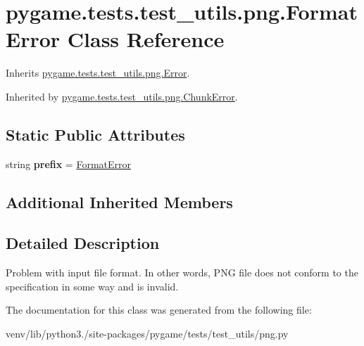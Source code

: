 \hypertarget{classpygame_1_1tests_1_1test__utils_1_1png_1_1_format_error}{}\section{pygame.\+tests.\+test\+\_\+utils.\+png.\+Format\+Error Class Reference}
\label{classpygame_1_1tests_1_1test__utils_1_1png_1_1_format_error}


Inherits \hyperlink{classpygame_1_1tests_1_1test__utils_1_1png_1_1_error}{pygame.\+tests.\+test\+\_\+utils.\+png.\+Error}.



Inherited by \hyperlink{classpygame_1_1tests_1_1test__utils_1_1png_1_1_chunk_error}{pygame.\+tests.\+test\+\_\+utils.\+png.\+Chunk\+Error}.

\subsection*{Static Public Attributes}
\begin{DoxyCompactItemize}
\item 
\mbox{\label{classpygame_1_1tests_1_1test__utils_1_1png_1_1_format_error_af99993f42bc30a0e9ec7fcd9a90ac852}} 
string {\bfseries prefix} = \textquotesingle{}\hyperlink{classpygame_1_1tests_1_1test__utils_1_1png_1_1_format_error}{Format\+Error}\textquotesingle{}
\end{DoxyCompactItemize}
\subsection*{Additional Inherited Members}


\subsection{Detailed Description}
\begin{DoxyVerb}Problem with input file format.  In other words, PNG file does
not conform to the specification in some way and is invalid.
\end{DoxyVerb}
 

The documentation for this class was generated from the following file\+:\begin{DoxyCompactItemize}
\item 
venv/lib/python3./site-\/packages/pygame/tests/test\+\_\+utils/png.\+py\end{DoxyCompactItemize}
